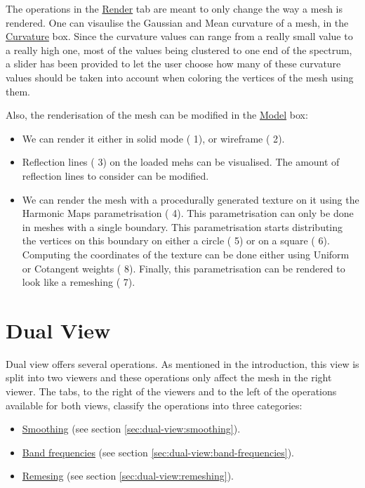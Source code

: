 \documentclass[12pt]{article}
\newcommand \tabbox[1] {\underline{#1}}
\newcommand \elem[1] {{\color{red} #1}}
\begin{document}
The operations in the \tabbox{Render} tab are meant to only change the
way a mesh is rendered. One can visaulise the Gaussian and Mean curvature
of a mesh, in the \tabbox{Curvature} box. Since the curvature values
can range from a really small value to a really high one, most of the
values being clustered to one end of the spectrum, a slider has been
provided to let the user choose how many of these curvature values should
be taken into account when coloring the vertices of the mesh using them.

\hfill

Also, the renderisation of the mesh can be modified in the \tabbox{Model}
box:
\begin{itemize}
	\item We can render it either in solid mode (\elem{1}), or wireframe
	(\elem{2}).
	\item Reflection lines (\elem{3}) on the loaded mehs can be visualised.
	The amount of reflection lines to consider can be modified.
	\item We can render the mesh
	with a procedurally generated texture on it using the Harmonic Maps
	parametrisation (\elem{4}). This parametrisation can only be done in
	meshes with a single boundary. This parametrisation starts distributing
	the vertices on this boundary on either a circle (\elem{5}) or on a
	square (\elem{6}). Computing the coordinates of the texture can be
	done either using Uniform or Cotangent weights (\elem{8}). Finally,
	this parametrisation can be rendered to look like a remeshing (\elem{7}).
\end{itemize}

\section{Dual View}
\label{sec:dual-view}

Dual view offers several operations. As mentioned in the introduction,
this view is split into two viewers and these operations only affect the
mesh in the right viewer. The tabs, to the right of the viewers and to the
left of the operations available for both views, classify the operations
into three categories:
\begin{itemize}
	\item \tabbox{Smoothing} (see section \ref{sec:dual-view:smoothing}).
	\item \tabbox{Band frequencies} (see section \ref{sec:dual-view:band-frequencies}).
	\item \tabbox{Remesing} (see section \ref{sec:dual-view:remeshing}).
\end{itemize}
\end{document}
